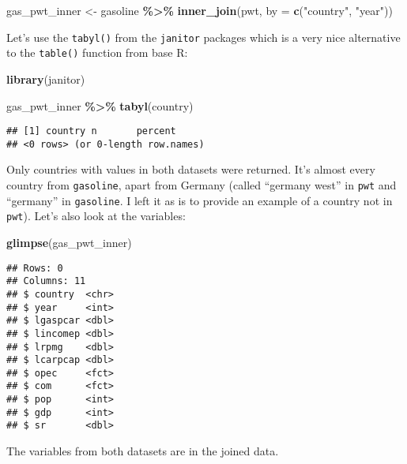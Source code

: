 \documentclass[
]{article}
\newenvironment{Shaded}{\begin{snugshade}}{\end{snugshade}}
\newcommand{\DataTypeTok}[1]{\textcolor[rgb]{0.13,0.29,0.53}{#1}}
\newcommand{\KeywordTok}[1]{\textcolor[rgb]{0.13,0.29,0.53}{\textbf{#1}}}
\newcommand{\NormalTok}[1]{#1}
\newcommand{\OperatorTok}[1]{\textcolor[rgb]{0.81,0.36,0.00}{\textbf{#1}}}
\newcommand{\StringTok}[1]{\textcolor[rgb]{0.31,0.60,0.02}{#1}}
\begin{document}
\begin{Shaded}
\begin{Highlighting}[]
\NormalTok{gas\_pwt\_inner \textless{}{-}}\StringTok{ }\NormalTok{gasoline }\OperatorTok{\%\textgreater{}\%}
\StringTok{  }\KeywordTok{inner\_join}\NormalTok{(pwt, }\DataTypeTok{by =} \KeywordTok{c}\NormalTok{(}\StringTok{"country"}\NormalTok{, }\StringTok{"year"}\NormalTok{))}
\end{Highlighting}
\end{Shaded}

Let's use the \texttt{tabyl()} from the \texttt{janitor} packages which is a very nice alternative to the \texttt{table()}
function from base R:

\begin{Shaded}
\begin{Highlighting}[]
\KeywordTok{library}\NormalTok{(janitor)}

\NormalTok{gas\_pwt\_inner }\OperatorTok{\%\textgreater{}\%}
\StringTok{  }\KeywordTok{tabyl}\NormalTok{(country)}
\end{Highlighting}
\end{Shaded}

\begin{verbatim}
## [1] country n       percent
## <0 rows> (or 0-length row.names)
\end{verbatim}

Only countries with values in both datasets were returned. It's almost every country from \texttt{gasoline},
apart from Germany (called ``germany west'' in \texttt{pwt} and ``germany'' in \texttt{gasoline}. I left it as is to
provide an example of a country not in \texttt{pwt}). Let's also look at the variables:

\begin{Shaded}
\begin{Highlighting}[]
\KeywordTok{glimpse}\NormalTok{(gas\_pwt\_inner)}
\end{Highlighting}
\end{Shaded}

\begin{verbatim}
## Rows: 0
## Columns: 11
## $ country  <chr> 
## $ year     <int> 
## $ lgaspcar <dbl> 
## $ lincomep <dbl> 
## $ lrpmg    <dbl> 
## $ lcarpcap <dbl> 
## $ opec     <fct> 
## $ com      <fct> 
## $ pop      <int> 
## $ gdp      <int> 
## $ sr       <dbl>
\end{verbatim}

The variables from both datasets are in the joined data.
\end{document}
